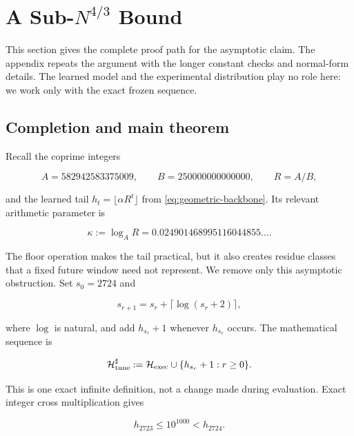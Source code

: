 \section{A \texorpdfstring{Sub-$N^{4/3}$}{Sub-N-to-the-4/3} Bound}
\label{sec:theory}

This section gives the complete proof path for the asymptotic claim.  The
appendix repeats the argument with the longer constant checks and normal-form
details.  The learned model and the experimental distribution play no role
here: we work only with the exact frozen sequence.

\subsection{Completion and main theorem}

Recall the coprime integers

\[
  A=582942583375009,\qquad B=250000000000000,\qquad
  R=A/B,
\]

and the learned tail $h_t=\lfloor\alpha R^t\rfloor$ from
\cref{eq:geometric-backbone}.  Its relevant arithmetic parameter is

\begin{equation}
  \kappa:=\log_A R
  =0.024901468995116044855\ldots.
  \label{eq:main-kappa}
\end{equation}

The floor operation makes the tail practical, but it also creates residue
classes that a fixed future window need not represent.  We remove only this
asymptotic obstruction.  Set $s_0=2724$ and

\begin{equation}
  s_{r+1}=s_r+\lceil\log(s_r+2)\rceil,
  \label{eq:main-companion-indices}
\end{equation}

where $\log$ is natural, and add $h_{s_r}+1$ whenever $h_{s_r}$ occurs.  The
mathematical sequence is

\begin{equation}
  \mathcal H^\sharp_{\rm tune}
  :=\mathcal H_{\rm exec}\cup\{h_{s_r}+1:r\ge0\}.
  \label{eq:main-completed-sequence}
\end{equation}

This is one exact infinite definition, not a change made during evaluation.
Exact integer cross multiplication gives

\begin{equation}
  h_{2723}\le10^{1000}<h_{2724}.
  \label{eq:main-guard}
\end{equation}

